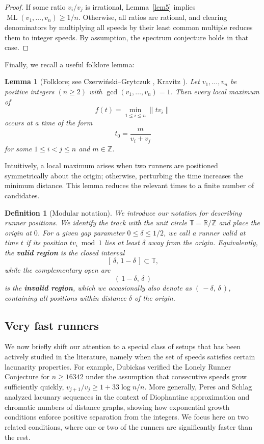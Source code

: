 \documentclass[11pt]{amsart}
\newtheorem{define}{Definition}[section]
\newtheorem{lemma}{Lemma}[section]
\DeclareMathOperator{\ML}{ML}
\begin{document}
\begin{proof}
    If some ratio $v_i/v_j$ is irrational, Lemma~\ref{lem5} implies $\ML(v_1,\ldots,v_n)\ge 1/n$. Otherwise, all ratios are rational, and clearing denominators by multiplying all speeds by their least common multiple reduces them to integer speeds. By assumption, the spectrum conjecture holds in that case.
\end{proof}

\par Finally, we recall a useful folklore lemma:

\begin{lemma}[Folklore; see Czerwiński--Grytczuk \cite{czerwinski2008}, Kravitz \cite{kravitz}]
\label{lem1}
    Let $v_1,\ldots,v_n$ be positive integers $(n \geq 2)$ with $\gcd(v_1,\ldots,v_n) = 1$. Then every local maximum of
    \[
       f(t) = \min_{1 \leq i \leq n} \|t v_i\|
    \]
    occurs at a time of the form
    \[
       t_0 = \frac{m}{v_i + v_j}
    \]
    for some $1 \leq i < j \leq n$ and $m \in \mathbb{Z}$.
\end{lemma}

\par Intuitively, a local maximum arises when two runners are positioned symmetrically about the origin; otherwise, perturbing the time increases the minimum distance. This lemma reduces the relevant times to a finite number of candidates.

\begin{define}[Modular notation]
We introduce our notation for describing runner positions. We identify the track with the unit circle $\mathbb{T} = \mathbb{R}/\mathbb{Z}$ and place the origin at $0$. For a given gap parameter $0 \leq \delta \leq 1/2$, we call a runner \emph{valid} at time $t$ if its position $tv_i \bmod 1$ lies at least $\delta$ away from the origin. 
Equivalently, the \textbf{valid region} is the closed interval 
$$ [\,\delta,\, 1-\delta\,] \subset \mathbb{T}, $$
while the complementary open arc 
$$ (\,1-\delta,\, \delta\,) $$
is the \textbf{invalid region}, which we occasionally also denote as $ (\,-\delta,\, \delta\,) $, containing all positions within distance $\delta$ of the origin.
\end{define}



\subsection{Very fast runners}
\par We now briefly shift our attention to a special class of setups that has been actively studied in the literature, namely when the set of speeds satisfies certain lacunarity properties. For example, Dubickas \cite{dubickas2011} verified the Lonely Runner Conjecture for $n \geq 16342$ under the assumption that consecutive speeds grow sufficiently quickly, $v_{j+1}/v_j \geq 1 + 33 \log n / n$. More generally, Peres and Schlag \cite{peres2010} analyzed lacunary sequences in the context of Diophantine approximation and chromatic numbers of distance graphs, showing how exponential growth conditions enforce positive separation from the integers. We focus here on two related conditions, where one or two of the runners are significantly faster than the rest.
\end{document}
